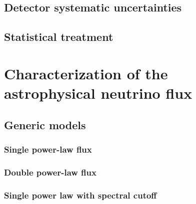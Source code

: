\subsection{Detector systematic uncertainties\label{sec:detector_systematics}}
\begingroup
\graphicspath{{results/HESE_Final_Paper/}}

\endgroup

\subsection{Statistical treatment\label{sec:statistics}}
\begingroup
\graphicspath{{results/HESE_Final_Paper/}}

\endgroup

\section{Characterization of the astrophysical neutrino flux\label{sec:diffuse}}
\begingroup
\graphicspath{{results/HESE_Final_Paper/}}

\endgroup

\subsection{Generic models\label{sec:generic_models}}
\begingroup
\graphicspath{{results/HESE_Final_Paper/}}

\endgroup

\subsubsection{Single power-law flux\label{sec:spl}}
\begingroup
\graphicspath{{results/HESE_Final_Paper/}}

\endgroup

\subsubsection{Double power-law flux\label{sec:dpl}}
\begingroup
\graphicspath{{results/HESE_Final_Paper/}}

\endgroup

\subsubsection{Single power law with spectral cutoff\label{sec:cutoff}}
\begingroup
\graphicspath{{results/HESE_Final_Paper/}}

\endgroup

